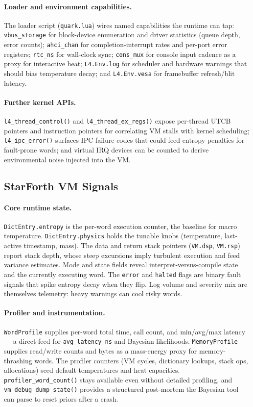 \paragraph{Loader and environment capabilities.} The loader script
(\texttt{quark.lua}) wires named capabilities the runtime can tap: \texttt{vbus\_storage}
for block-device enumeration and driver statistics (queue depth, error counts);
\texttt{ahci\_chan} for completion-interrupt rates and per-port error registers;
\texttt{rtc\_ns} for wall-clock sync; \texttt{cons\_mux} for console input cadence as
a proxy for interactive heat; \texttt{L4.Env.log} for scheduler and hardware warnings
that should bias temperature decay; and \texttt{L4.Env.vesa} for framebuffer
refresh/blit latency.

\paragraph{Further kernel APIs.} \texttt{l4\_thread\_control()} and
\texttt{l4\_thread\_ex\_regs()} expose per-thread UTCB pointers and instruction
pointers for correlating VM stalls with kernel scheduling; \texttt{l4\_ipc\_error()}
surfaces IPC failure codes that could feed entropy penalties for fault-prone words;
and virtual IRQ devices can be counted to derive environmental noise injected into the
VM.

\subsection{StarForth VM Signals}

\paragraph{Core runtime state.} \texttt{DictEntry.entropy} is the per-word execution
counter, the baseline for macro temperature. \texttt{DictEntry.physics} holds the
tunable knobs (temperature, last-active timestamp, mass). The data and return stack
pointers (\texttt{VM.dsp}, \texttt{VM.rsp}) report stack depth, whose steep excursions
imply turbulent execution and feed variance estimates. Mode and state fields reveal
interpret-versus-compile state and the currently executing word. The \texttt{error}
and \texttt{halted} flags are binary fault signals that spike entropy decay when they
flip. Log volume and severity mix are themselves telemetry: heavy warnings can cool
risky words.

\paragraph{Profiler and instrumentation.} \texttt{WordProfile} supplies per-word total
time, call count, and min/avg/max latency --- a direct feed for \texttt{avg\_latency\_ns}
and Bayesian likelihoods. \texttt{MemoryProfile} supplies read/write counts and bytes
as a mass-energy proxy for memory-thrashing words. The profiler counters (VM cycles,
dictionary lookups, stack ops, allocations) seed default temperatures and heat
capacities. \texttt{profiler\_word\_count()} stays available even without detailed
profiling, and \texttt{vm\_debug\_dump\_state()} provides a structured post-mortem the
Bayesian tool can parse to reset priors after a crash.

